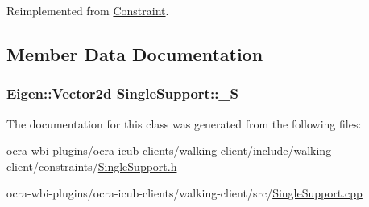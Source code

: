 \-Reimplemented from \hyperlink{classConstraint_a07453509c3f0f95034db965c9e699810}{\-Constraint}.



\subsection{\-Member \-Data \-Documentation}
\hypertarget{classSingleSupport_a5b26007c52ad9b2ed45c6ca4f1aef345}{
\subsubsection[{\-\_\-\-S}]{\setlength{\rightskip}{0pt plus 5cm}\-Eigen\-::\-Vector2d {\bf \-Single\-Support\-::\-\_\-\-S}}}\label{classSingleSupport_a5b26007c52ad9b2ed45c6ca4f1aef345}


\-The documentation for this class was generated from the following files\-:\begin{DoxyCompactItemize}
\item 
ocra-\/wbi-\/plugins/ocra-\/icub-\/clients/walking-\/client/include/walking-\/client/constraints/\hyperlink{SingleSupport_8h}{\-Single\-Support.\-h}\item 
ocra-\/wbi-\/plugins/ocra-\/icub-\/clients/walking-\/client/src/\hyperlink{SingleSupport_8cpp}{\-Single\-Support.\-cpp}\end{DoxyCompactItemize}
